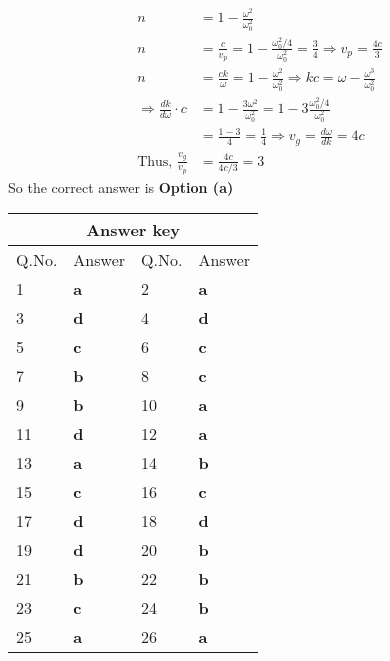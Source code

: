 \begin{enumerate}
\begin{answer}
		\begin{align*}
		n&=1-\frac{\omega^{2}}{\omega_{0}^{2}}\\
		n&=\frac{c}{v_{p}}=1-\frac{\omega_{0}^{2} / 4}{\omega_{0}^{2}}=\frac{3}{4} \Rightarrow v_{p}=\frac{4 c}{3}\\
		n&=\frac{c k}{\omega}=1-\frac{\omega^{2}}{\omega_{0}^{2}} \Rightarrow k c=\omega-\frac{\omega^{3}}{\omega_{0}^{2}}\\
		\Rightarrow \frac{d k}{d \omega} \cdot c&=1-\frac{3 \omega^{2}}{\omega_{0}^{2}}=1-3 \frac{\omega_{0}^{2} / 4}{\omega_{0}^{2}}\\&=\frac{1-3}{4}=\frac{1}{4} \Rightarrow v_{g}=\frac{d \omega}{d k}=4 c\\
		\text{Thus, }\frac{v_{g}}{v_{p}}&=\frac{4 c}{4 c / 3}=3
		\end{align*}
		So the correct answer is \textbf{Option (a)}
	\end{answer}
\end{enumerate}


\setlength\arrayrulewidth{1pt}
\begin{table}[H]
	\centering
	
	\begin{tabular}{|p{1.5cm}|p{1.5cm}||p{1.5cm}|p{1.5cm}|}
		\hline
		\multicolumn{4}{|c|}{\textbf{Answer key}}\\\hline\hline
		\rowcolor{ocrel}Q.No.&Answer&Q.No.&Answer\\\hline
		1&\textbf{a}&2&\textbf{a}\\\hline
		3&\textbf{d}&4&\textbf{d}\\\hline
		5&\textbf{c}&6&\textbf{c}\\\hline
		7&\textbf{b}&8&\textbf{c}\\\hline
		9&\textbf{b}&10&\textbf{a}\\\hline
		11&\textbf{d}&12&\textbf{a}\\\hline
		13&\textbf{a}&14&\textbf{b}\\\hline
		15&\textbf{c}&16&\textbf{c}\\\hline
		17&\textbf{d}&18&\textbf{d}\\\hline
		19&\textbf{d}&20&\textbf{b}\\\hline
		21&\textbf{b}&22&\textbf{b}\\\hline
		23&\textbf{c}&24&\textbf{b}\\\hline
		25&\textbf{a}&26&\textbf{a}\\\hline
	\end{tabular}
\end{table}








